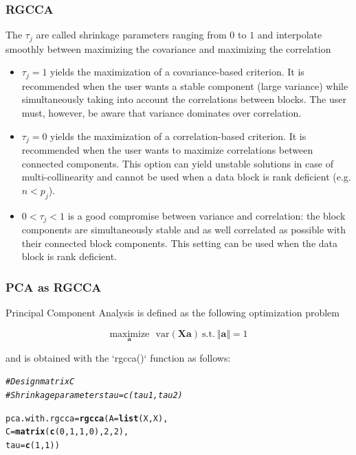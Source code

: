 \documentclass[10pt,xcolor=dvipsnames]{beamer}\usepackage[]{graphicx}\usepackage[]{color}
\makeatletter
\newcommand{\hlnum}[1]{\textcolor[rgb]{0.686,0.059,0.569}{#1}}%
\newcommand{\hlcom}[1]{\textcolor[rgb]{0.678,0.584,0.686}{\textit{#1}}}%
\newcommand{\hlstd}[1]{\textcolor[rgb]{0.345,0.345,0.345}{#1}}%
\newcommand{\hlkwb}[1]{\textcolor[rgb]{0.69,0.353,0.396}{#1}}%
\newcommand{\hlkwc}[1]{\textcolor[rgb]{0.333,0.667,0.333}{#1}}%
\newcommand{\hlkwd}[1]{\textcolor[rgb]{0.737,0.353,0.396}{\textbf{#1}}}%
\newenvironment{kframe}{%
 \def\at@end@of@kframe{}%
 \ifinner\ifhmode%
  \def\at@end@of@kframe{\end{minipage}}%
  \begin{minipage}{\columnwidth}%
 \fi\fi%
 \def\FrameCommand##1{\hskip\@totalleftmargin \hskip-\fboxsep
 \colorbox{shadecolor}{##1}\hskip-\fboxsep
     \hskip-\linewidth \hskip-\@totalleftmargin \hskip\columnwidth}%
 \MakeFramed {\advance\hsize-\width
   \@totalleftmargin\z@ \linewidth\hsize
   \@setminipage}}%
 {\par\unskip\endMakeFramed%
 \at@end@of@kframe}
\newenvironment{knitrout}{}{} %
\newcommand{\X}{\mathbf{X}}
\newcommand{\ma}[1]{\ensuremath{\mathbf{#1}}}
\makeatother
\begin{document}
\begin{frame}[plain]\frametitle{RGCCA}

The $\tau_j$  are called shrinkage parameters ranging from $0$ to $1$ and interpolate smoothly between maximizing the covariance and maximizing the correlation

\begin{itemize}
 \item $\tau_j=1$ yields the maximization of a covariance-based criterion. It is recommended when the user wants a stable component (large variance) while simultaneously taking into account the correlations 
between blocks. The user must, however, be aware that variance dominates over correlation.
    \item $\tau_j=0$ yields the maximization of a correlation-based criterion. It is recommended when the user wants to maximize correlations between connected components. This option can yield unstable solutions in case of multi-collinearity and cannot be used when a data block is rank deficient (e.g. $n<p_j$).
    \item $0<\tau_j<1$ is a good compromise between variance and correlation: the block components are simultaneously stable and as well correlated as possible with their connected block components. This setting can be used when the data block is rank deficient. 

\end{itemize}

\end{frame}



\begin{frame}\frametitle{PCA as RGCCA}

Principal Component Analysis is defined as the following optimization problem 

\begin{equation*}
\underset{\ma a}{\text{maximize}} \text{~~var}\left(\X \ma a \right) \mathrm{~s.t.~} \Vert \ma a \Vert = 1
\label{PCA1}
\end{equation*}

and is obtained with the `rgcca()` function as follows:

\begin{knitrout}\footnotesize
{}\color{fgcolor}\begin{kframe}
\begin{alltt}
\hlcom{# Design matrix C}
\hlcom{# Shrinkage parameters tau = c(tau1, tau2)}

\hlstd{pca.with.rgcca} \hlkwb{=} \hlkwd{rgcca}\hlstd{(}\hlkwc{A} \hlstd{=} \hlkwd{list}\hlstd{(X, X),}
                       \hlkwc{C} \hlstd{=} \hlkwd{matrix}\hlstd{(}\hlkwd{c}\hlstd{(}\hlnum{0}\hlstd{,} \hlnum{1}\hlstd{,} \hlnum{1}\hlstd{,} \hlnum{0}\hlstd{),} \hlnum{2}\hlstd{,} \hlnum{2}\hlstd{),}
                       \hlkwc{tau} \hlstd{=} \hlkwd{c}\hlstd{(}\hlnum{1}\hlstd{,} \hlnum{1}\hlstd{))}
\end{alltt}
\end{kframe}
\end{knitrout}
\end{frame}
\end{document}
